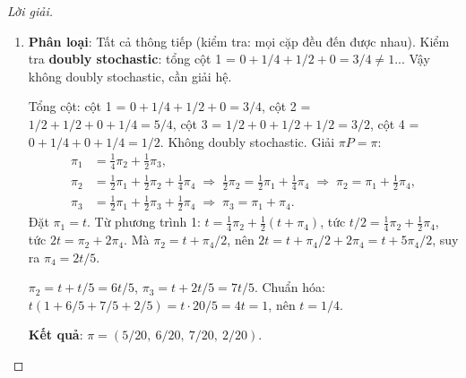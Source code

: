 \documentclass[8pt,a4paper]{article}
\newenvironment{solution}{\begin{proof}[Lời giải]}{\end{proof}}
\begin{document}
\begin{solution}
\begin{enumerate}[label=(\alph*)]
Phân phối dừng trên $\{1,2\}$: $\alpha = 1/2$, $\beta = 1/4$, nên $\pi_1^* = (1/4)/(1/2+1/4) = 1/3$, $\pi_2^* = 2/3$.

\textbf{Kết quả}: Phân phối dừng không duy nhất. Dạng tổng quát: $\pi = (1/3,\ 2/3,\ 0,\ 0)$ (vì mọi trạng thái ngoài lớp $\{1,2\}$ đều thoáng qua và cuối cùng bị hút vào $\{1,2\}$).

\item \textbf{Phân loại}: Tất cả thông tiếp (kiểm tra: mọi cặp đều đến được nhau). Kiểm tra \textbf{doubly stochastic}: tổng cột 1 = $0+1/4+1/2+0 = 3/4 \neq 1$... Vậy không doubly stochastic, cần giải hệ.

Tổng cột: cột 1 = $0+1/4+1/2+0 = 3/4$, cột 2 = $1/2+1/2+0+1/4 = 5/4$, cột 3 = $1/2+0+1/2+1/2 = 3/2$, cột 4 = $0+1/4+0+1/4 = 1/2$. Không doubly stochastic. Giải $\pi P = \pi$:
\begin{align*}
  \pi_1 &= \tfrac{1}{4}\pi_2 + \tfrac{1}{2}\pi_3, \\
  \pi_2 &= \tfrac{1}{2}\pi_1 + \tfrac{1}{2}\pi_2 + \tfrac{1}{4}\pi_4 \;\Rightarrow\; \tfrac{1}{2}\pi_2 = \tfrac{1}{2}\pi_1 + \tfrac{1}{4}\pi_4 \;\Rightarrow\; \pi_2 = \pi_1 + \tfrac{1}{2}\pi_4, \\
  \pi_3 &= \tfrac{1}{2}\pi_1 + \tfrac{1}{2}\pi_3 + \tfrac{1}{2}\pi_4 \;\Rightarrow\; \pi_3 = \pi_1 + \pi_4.
\end{align*}
Đặt $\pi_1 = t$. Từ phương trình 1: $t = \frac{1}{4}\pi_2 + \frac{1}{2}(t + \pi_4)$, tức $t/2 = \frac{1}{4}\pi_2 + \frac{1}{2}\pi_4$, tức $2t = \pi_2 + 2\pi_4$. Mà $\pi_2 = t + \pi_4/2$, nên $2t = t + \pi_4/2 + 2\pi_4 = t + 5\pi_4/2$, suy ra $\pi_4 = 2t/5$.

$\pi_2 = t + t/5 = 6t/5$, $\pi_3 = t + 2t/5 = 7t/5$. Chuẩn hóa: $t(1 + 6/5 + 7/5 + 2/5) = t \cdot 20/5 = 4t = 1$, nên $t = 1/4$.

\textbf{Kết quả}: $\pi = (5/20,\ 6/20,\ 7/20,\ 2/20)$.
\end{enumerate}
\end{solution}
\end{document}
